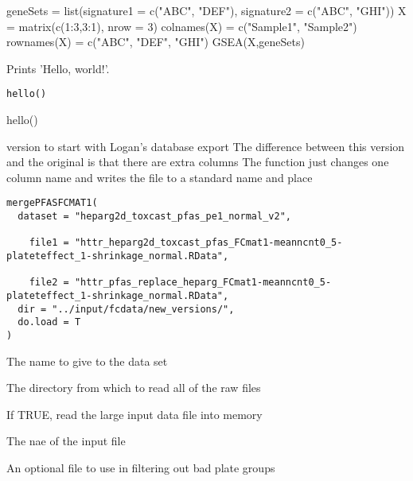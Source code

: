 \documentclass[letterpaper]{book}
\begin{document}
%
\begin{Examples}
\begin{ExampleCode}
geneSets = list(signature1 = c("ABC", "DEF"), signature2 = c("ABC", "GHI"))
X = matrix(c(1:3,3:1), nrow = 3)
colnames(X) = c("Sample1", "Sample2")
rownames(X) = c("ABC", "DEF", "GHI")
GSEA(X,geneSets)
\end{ExampleCode}
\end{Examples}
%
\begin{Description}\relax
Prints 'Hello, world!'.
\end{Description}
%
\begin{Usage}
\begin{verbatim}
hello()
\end{verbatim}
\end{Usage}
%
\begin{Examples}
\begin{ExampleCode}
hello()
\end{ExampleCode}
\end{Examples}
%
\begin{Description}\relax
version to start with Logan's database export
The difference between this version and the original is that there are extra columns
The function just changes one column name and writes the file to a standard name and place
\end{Description}
%
\begin{Usage}
\begin{verbatim}
mergePFASFCMAT1(
  dataset = "heparg2d_toxcast_pfas_pe1_normal_v2",
 
    file1 = "httr_heparg2d_toxcast_pfas_FCmat1-meanncnt0_5-plateteffect_1-shrinkage_normal.RData",
 
    file2 = "httr_pfas_replace_heparg_FCmat1-meanncnt0_5-plateteffect_1-shrinkage_normal.RData",
  dir = "../input/fcdata/new_versions/",
  do.load = T
)
\end{verbatim}
\end{Usage}
%
\begin{Arguments}
\begin{ldescription}
\item[\code{dataset}] The name to give to the data set

\item[\code{dir}] The directory from which to read all of the raw files

\item[\code{do.load}] If TRUE, read the large input data file into memory

\item[\code{infile}] The nae of the input file

\item[\code{pg.filter.file}] An optional file to use in filtering out bad plate groups
\end{ldescription}
\end{Arguments}
\end{document}
